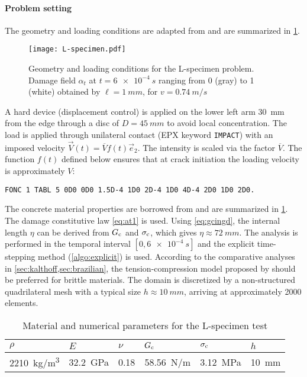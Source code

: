 \paragraph{Problem setting}
The geometry and loading conditions are adapted from \cite{OzboltBedeSharmaMayer:2015} and are summarized in \cref{fig:L-specimen}.
\begin{figure}[htbp]
\centering
\texttt{[image: L-specimen.pdf]}
\caption{Geometry and loading conditions for the L-specimen problem. Damage field $\alpha_t$ at $t=\SI{6e-4}{s}$ ranging from 0 (gray) to 1 (white) obtained by $\ell=\SI{1}{mm}$, for $v=\SI{0.74}{m/s}$} \label{fig:L-specimen}
\end{figure}
A hard device (displacement control) is applied on the lower left arm \SI{30}{mm} from the edge through a disc of $D=\SI{45}{mm}$ to avoid local concentration. The load is applied through unilateral contact (EPX keyword \texttt{IMPACT}) with an imposed velocity $\vec{V}(t)=\overline{V}f(t)\vec{e}_2$. The intensity is scaled via the factor $\overline{V}$. The function $f(t)$ defined below ensures that at crack initiation the loading velocity is approximately $V$:
\begin{mdframed}[hidealllines=true,backgroundcolor=gray!20]
\begin{verbatim}
FONC 1 TABL 5 0D0 0D0 1.5D-4 1D0 2D-4 1D0 4D-4 2D0 1D0 2D0.
\end{verbatim}
\end{mdframed}
The concrete material properties are borrowed from \cite{OzboltBedeSharmaMayer:2015} and are summarized in \cref{tab:L}. The damage constitutive law \eqref{eq:at1} is used. Using \eqref{eq:gcingd}, the internal length $\eta$ can be derived from $G_\mathrm{c}$ and $\sigma_{\mathrm{c}}$, which gives $\eta\approx \SI{72}{mm}$. The analysis is performed in the temporal interval $[0,\SI{6e-4}{s}]$ and the explicit time-stepping method (\cref{algo:explicit}) is used. According to the comparative analyses in \cref{sec:kalthoff,sec:brazilian}, the tension-compression model proposed by \cite{FreddiRoyer-Carfagni:2010} should be preferred for brittle materials. The domain is discretized by a non-structured quadrilateral mesh with a typical size $h\approx\SI{10}{mm}$, arriving at approximately \num{2000} elements. 
\begin{table}[htbp]
\centering
\caption{Material and numerical parameters for the L-specimen test} \label{tab:L}
\begin{tabular}{llllll} \toprule
$\rho$ & $E$ & $\nu$ & $G_\mathrm{c}$ & $\sigma_{\mathrm{c}}$ & $h$ \\ \midrule
\SI{2210}{kg/m^3} & \SI{32.2}{GPa} & 0.18 & \SI{58.56}{N/m} & \SI{3.12}{MPa} & \SI{10}{mm} \\ \bottomrule
\end{tabular}
\end{table}

